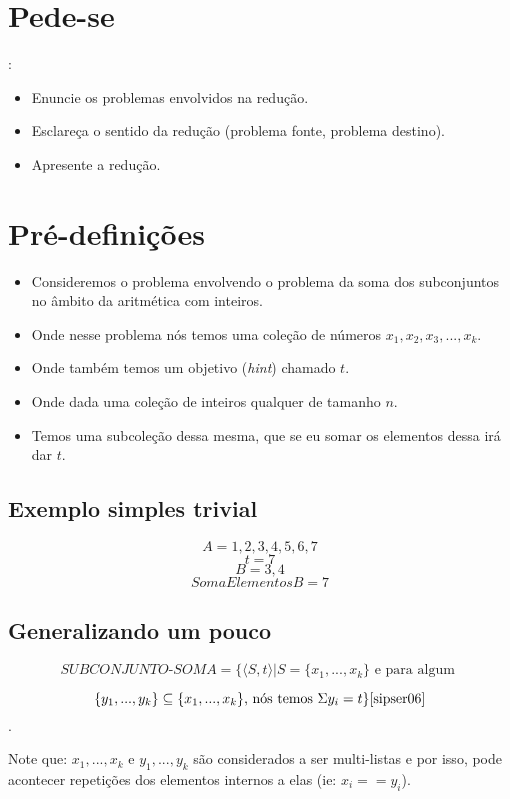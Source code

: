 \documentclass[12pt, a4paper]{article}
\begin{document}
\section{Pede-se}:

\begin{itemize}
  \item Enuncie os problemas envolvidos na redução.
  \item Esclareça o sentido da redução (problema fonte, problema destino).
  \item Apresente a redução.
\end{itemize}

\section{Pré-definições}

\begin{itemize}
  \item Consideremos o problema envolvendo o problema da soma dos subconjuntos no âmbito da aritmética com inteiros.
  \item Onde nesse problema nós temos uma coleção de números $x_1,x_2,x_3,...,x_k$.
  \item Onde também temos um objetivo (\textit{hint}) chamado $t$.
  \item Onde dada uma coleção de inteiros qualquer de tamanho $n$.
  \item Temos uma subcoleção dessa mesma, que se eu somar os elementos dessa irá dar $t$.
\end{itemize}

\subsection{Exemplo simples trivial}

$$A = {1,2,3,4,5,6,7}$$
$$t = 7$$
$$B = {3, 4}$$
$$SomaElementosB = 7$$

\subsection{Generalizando um pouco}

$$ \textit{SUBCONJUNTO-SOMA} = \lbrace \langle S, t \rangle | S = \lbrace  x_1,...,x_k \rbrace \text{ e para algum }$$

$$ \lbrace y_1,...,y_k \rbrace \subseteq \lbrace  x_1,...,x_k \rbrace \text{, nós temos } \Sigma{y_i} = t \rbrace \cite{sipser06}$$.

Note que: $x_1,...,x_k$ e $y_1,...,y_k$ são considerados a ser multi-listas e por isso, pode acontecer repetições dos elementos internos a elas (ie: $x_i == y_i$).
\end{document}
